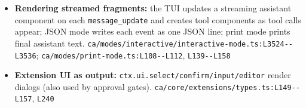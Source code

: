 \begin{itemize}
\item \textbf{Rendering streamed fragments:} the TUI updates a streaming assistant component on each \texttt{message\_\allowbreak{}update} and creates tool components as tool calls appear; JSON mode writes each event as one JSON line; print mode prints final assistant text. \texttt{ca/\allowbreak{}modes/\allowbreak{}interactive/\allowbreak{}interactive-\allowbreak{}mode.\allowbreak{}ts:\allowbreak{}L3524-\allowbreak{}-\allowbreak{}L3536}; \texttt{ca/\allowbreak{}modes/\allowbreak{}print-\allowbreak{}mode.\allowbreak{}ts:\allowbreak{}L108-\allowbreak{}-\allowbreak{}L112}, \texttt{L139-\allowbreak{}-\allowbreak{}L158}
\item \textbf{Extension UI as output:} \texttt{ctx.\allowbreak{}ui.\allowbreak{}select/\allowbreak{}confirm/\allowbreak{}input/\allowbreak{}editor} render dialogs (also used by approval gates). \texttt{ca/\allowbreak{}core/\allowbreak{}extensions/\allowbreak{}types.\allowbreak{}ts:\allowbreak{}L149-\allowbreak{}-\allowbreak{}L157}, \texttt{L240}
\end{itemize}

